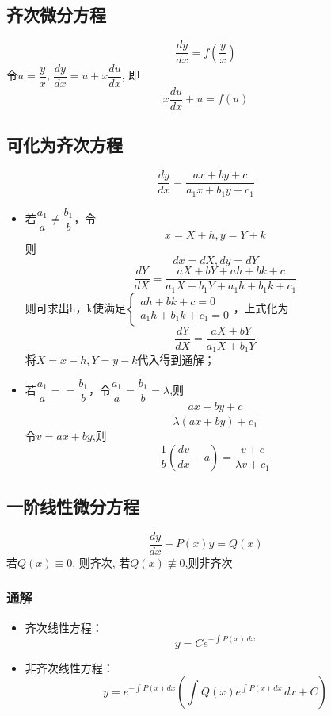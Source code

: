 \subsection{齐次微分方程}
\[\dfrac{dy}{dx} = f(\dfrac{y}{x})\]
令\(u = \dfrac{y}{x}\), \(\dfrac{dy}{dx} = u + x\dfrac{du}{dx}\), 即
\[x\dfrac{du}{dx} + u = f(u)\]


\subsection{可化为齐次方程}

\[\dfrac{dy}{dx} = \dfrac{ax + by + c}{a_1x + b_1y + c_1}\]

\begin{itemize}
    \item 若\(\dfrac{a_1}{a} \neq \dfrac{b_1}{b}\)，令\[x = X + h, y = Y + k\]
    则\[dx = dX, dy = dY\]
    \[\dfrac{dY}{dX} = \dfrac{aX + bY + ah + bk + c}{a_1X + b_1Y + a_1h + b_1k + c_1}\]
    则可求出h，k使满足\(\begin{cases}
        ah + bk + c = 0 \\
        a_1h + b_1k + c_1 = 0
    \end{cases}\)，上式化为
    \[\dfrac{dY}{dX} = \dfrac{aX + bY}{a_1X + b_1Y}\]
    将\(X = x - h, Y = y - k\)代入得到通解；
    
    \item 若\(\dfrac{a_1}{a} == \dfrac{b_1}{b}\)，令\(\dfrac{a_1}{a} = \dfrac{b_1}{b} = \lambda\),则
    \[\dfrac{ax + by + c}{\lambda(ax + by) + c_1}\]
    令\(v = ax + by\),则\[\dfrac{1}{b}(\dfrac{dv}{dx} - a) = \dfrac{v + c}{\lambda v + c_1}\]
\end{itemize}


\subsection{一阶线性微分方程}
\[\dfrac{dy}{dx} + P(x)y = Q(x)\]
若\(Q(x) \equiv 0\), 则齐次, 若\(Q(x) \not\equiv 0\),则非齐次

\subsubsection{通解}
\begin{itemize}
    \item 齐次线性方程：\[y = Ce^{-\int_{}^{} P(x) \,dx}\]
    \item 非齐次线性方程：\[y = e^{-\int_{}^{} P(x) \,dx}(\int_{}^{}Q(x)e^{\int_{}^{}P(x) \,dx} \,dx + C)\]
\end{itemize}


